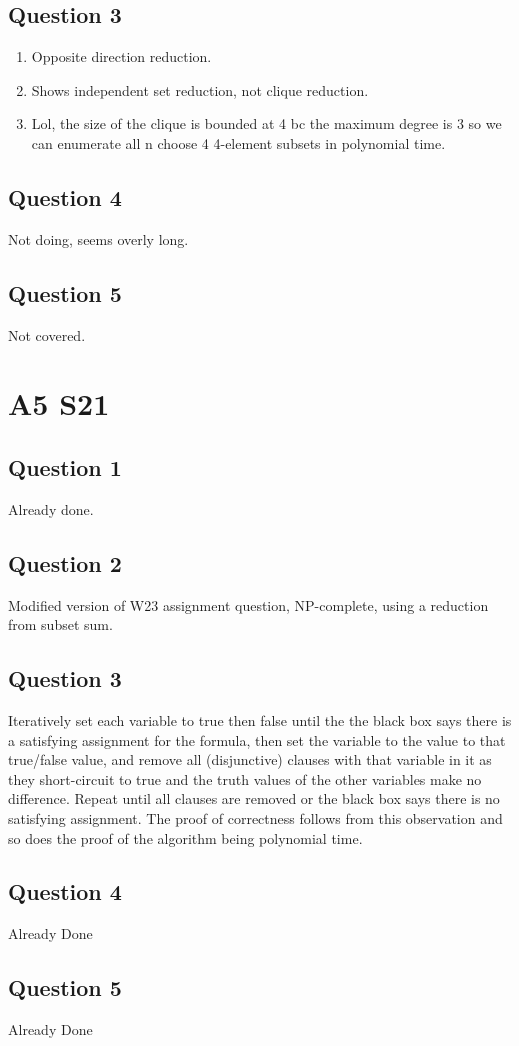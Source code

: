 \documentclass[11pt]{article}
\begin{document}
\subsection{Question 3}

\begin{enumerate}
    \item Opposite direction reduction.
    \item Shows independent set reduction, not clique reduction.
    \item Lol, the size of the clique is bounded at 4 bc the maximum degree is 3 so we can enumerate all n choose 4 4-element subsets in polynomial time.
\end{enumerate}

\subsection{Question 4}

Not doing, seems overly long.

\subsection{Question 5}

Not covered.

\section{A5 S21}

\subsection{Question 1}

Already done.

\subsection{Question 2}

Modified version of W23 assignment question, NP-complete, using a reduction from subset sum.

\subsection{Question 3}

Iteratively set each variable to true then false until the the black box says there is a satisfying assignment for the formula, then set the variable to the value to that true/false value, and remove all (disjunctive) clauses with that variable in it as they short-circuit to true and the truth values of the other variables make no difference. Repeat until all clauses are removed or the black box says there is no satisfying assignment. The proof of correctness follows from this observation and so does the proof of the algorithm being polynomial time.

\subsection{Question 4}

Already Done

\subsection{Question 5}

Already Done
\end{document}
